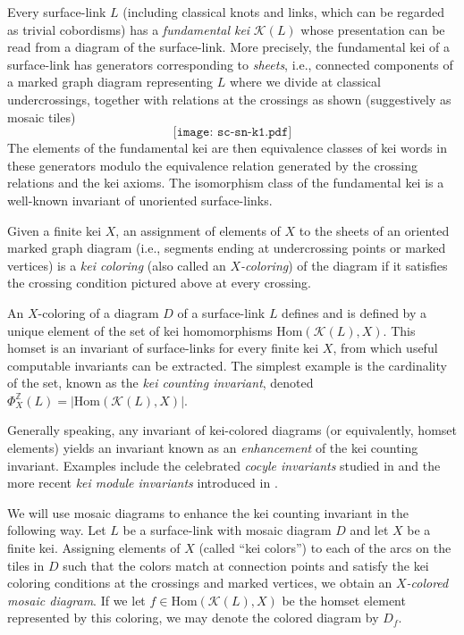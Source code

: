 \documentclass{article}
\theoremstyle{definition}
\begin{document}
Every surface-link $L$ (including classical knots and links, which can be
regarded as trivial cobordisms) has a \textit{fundamental kei} $\mathcal{K}(L)$
whose presentation can be read from a diagram of the surface-link. More 
precisely, the fundamental kei of a surface-link has generators corresponding 
to \textit{sheets}, i.e., connected components of a marked graph diagram 
representing $L$ where we divide at classical undercrossings, together with 
relations at the crossings as shown (suggestively as mosaic tiles)
\[\texttt{[image: sc-sn-k1.pdf]}\]
The elements of the fundamental kei are then equivalence classes of kei
words in these generators modulo the equivalence relation generated by
the crossing relations and the kei axioms. The isomorphism class of the 
fundamental kei is a well-known invariant of unoriented surface-links.
 
Given a finite kei $X$, an assignment of elements of $X$ to the 
sheets of an oriented marked graph diagram (i.e., segments ending at 
undercrossing points or marked vertices) is a \textit{kei coloring} (also 
called an \textit{$X$-coloring}) of the diagram if it satisfies the crossing
condition pictured above at every crossing.

An $X$-coloring of a diagram $D$ of a surface-link $L$ defines and is defined 
by a unique element of the set of kei homomorphisms 
$\mathrm{Hom}(\mathcal{K}(L),X)$. This homset is an invariant of surface-links
for every finite kei $X$, from which useful computable invariants can be
extracted. The simplest example is the cardinality of the set, known as
the \textit{kei counting invariant}, denoted 
$\Phi_X^{\mathbb{Z}}(L)=|\mathrm{Hom}(\mathcal{K}(L),X)|$.

Generally speaking, any invariant of kei-colored diagrams (or equivalently,
homset elements) yields an invariant known as an \textit{enhancement} of the
kei counting invariant. Examples include the celebrated \textit{cocyle 
invariants} studied in \cite{CJKLS} and the more recent \textit{kei module 
invariants} introduced in \cite{JN}.

We will use mosaic diagrams to enhance the kei counting invariant in the 
following way. Let $L$ be a surface-link with mosaic diagram $D$ and let
$X$ be a finite kei. Assigning elements of $X$ (called ``kei colors'') 
to each of the arcs on the tiles in $D$ such that the colors match
at connection points and satisfy the kei coloring conditions at the 
crossings and marked vertices, we obtain an \textit{$X$-colored mosaic diagram}.
If we let $f\in\mathrm{Hom}(\mathcal{K}(L),X)$ be the homset element
represented by this coloring, we may denote the colored diagram by $D_f$.
\end{document}
